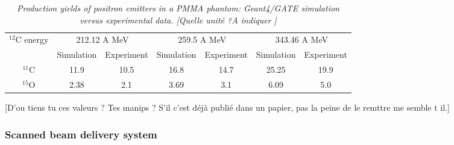 \documentclass[11pt]{iopart}
\newcommand{\dsnote}[1]{{\color{green}[#1]}}
\begin{document}
\begin{table}[htbp]
\begin{center}
  \begin{tabular}{|c|c|c|c|c|c|c|} \hline
    $^{12}$C energy  & \multicolumn{2}{|c|}{212.12 A MeV}  & \multicolumn{2}{|c|}{259.5 A MeV}  & \multicolumn{2}{|c|}{343.46 A MeV}       \\
    \cline{2-7} & Simulation & Experiment & Simulation & Experiment &
    Simulation & Experiment \\ \hline \hline 
    $^{11}$C             & 11.9  &  10.5  &  16.8  &  14.7  &  25.25  &  19.9      \\ \hline
    $^{15}$O             & 2.38  &  2.1  &  3.69  &  3.1   &  6.09   &  5.0        \\ \hline \hline 

\end{tabular}
\end{center} 
\caption{\it Production yields of positron emitters in a PMMA phantom: Geant4/GATE simulation versus experimental data. \dsnote{Quelle unité ?A indiquer }} 
\label{tab:CrossSection}
\end{table}

\dsnote{D'ou tiens tu ces valeurs ? Tes manips ? S'il c'est déjà
  publié dans un papier, pas la peine de le remttre me semble t il.}


\subsubsection{Scanned beam delivery system}
\end{document}
